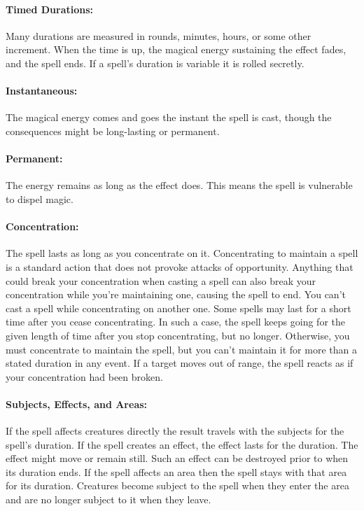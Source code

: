\paragraph{Timed Durations:} Many durations are measured in rounds, minutes, hours, or some other increment. When the time is up, the magical energy sustaining the effect fades, and the spell ends. If a spell's duration is variable it is rolled secretly.

\paragraph{Instantaneous:} The magical energy comes and goes the instant the spell is cast, though the consequences might be long-lasting or permanent.

\paragraph{Permanent:} The energy remains as long as the effect does. This means the spell is vulnerable to dispel magic.

\paragraph{Concentration:} The spell lasts as long as you concentrate on it. Concentrating to maintain a spell is a standard action that does not provoke attacks of opportunity. Anything that could break your concentration when casting a spell can also break your concentration while you're maintaining one, causing the spell to end. You can't cast a spell while concentrating on another one. Some spells may last for a short time after you cease concentrating. In such a case, the spell keeps going for the given length of time after you stop concentrating, but no longer. Otherwise, you must concentrate to maintain the spell, but you can't maintain it for more than a stated duration in any event. If a target moves out of range, the spell reacts as if your concentration had been broken.

\paragraph{Subjects, Effects, and Areas:} If the spell affects creatures directly the result travels with the subjects for the spell's duration. If the spell creates an effect, the effect lasts for the duration. The effect might move or remain still. Such an effect can be destroyed prior to when its duration ends. If the spell affects an area then the spell stays with that area for its duration. Creatures become subject to the spell when they enter the area and are no longer subject to it when they leave.

